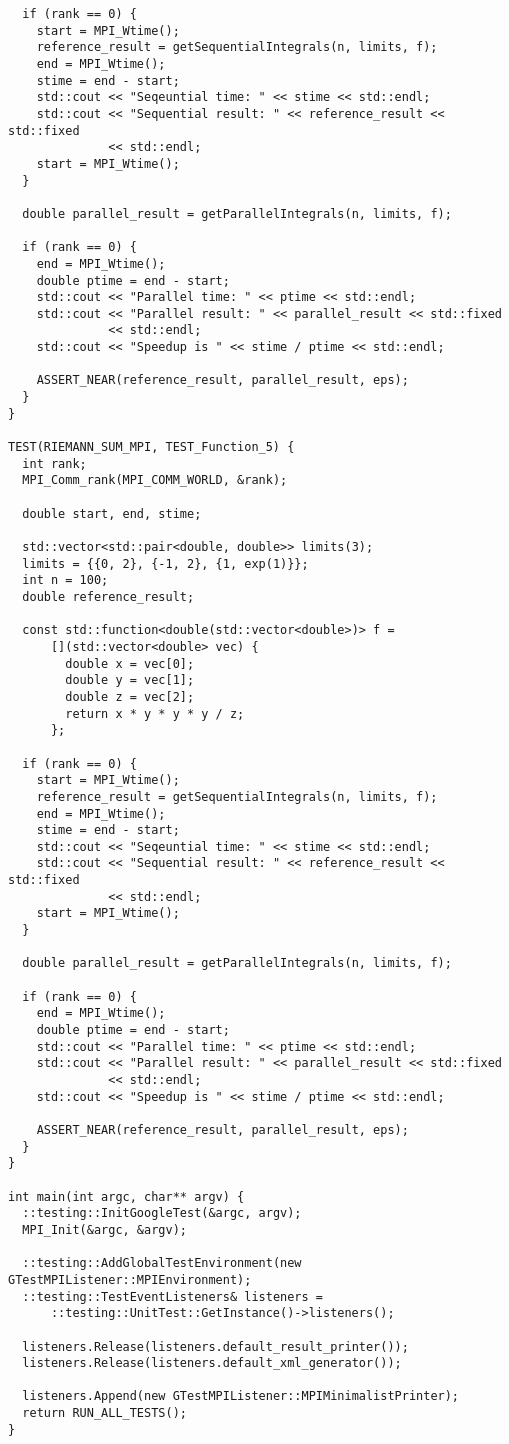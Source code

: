 \documentclass{report}
\begin{document}
\begin{lstlisting}
  if (rank == 0) {
    start = MPI_Wtime();
    reference_result = getSequentialIntegrals(n, limits, f);
    end = MPI_Wtime();
    stime = end - start;
    std::cout << "Seqeuntial time: " << stime << std::endl;
    std::cout << "Sequential result: " << reference_result << std::fixed
              << std::endl;
    start = MPI_Wtime();
  }

  double parallel_result = getParallelIntegrals(n, limits, f);

  if (rank == 0) {
    end = MPI_Wtime();
    double ptime = end - start;
    std::cout << "Parallel time: " << ptime << std::endl;
    std::cout << "Parallel result: " << parallel_result << std::fixed
              << std::endl;
    std::cout << "Speedup is " << stime / ptime << std::endl;

    ASSERT_NEAR(reference_result, parallel_result, eps);
  }
}

TEST(RIEMANN_SUM_MPI, TEST_Function_5) {
  int rank;
  MPI_Comm_rank(MPI_COMM_WORLD, &rank);

  double start, end, stime;

  std::vector<std::pair<double, double>> limits(3);
  limits = {{0, 2}, {-1, 2}, {1, exp(1)}};
  int n = 100;
  double reference_result;

  const std::function<double(std::vector<double>)> f =
      [](std::vector<double> vec) {
        double x = vec[0];
        double y = vec[1];
        double z = vec[2];
        return x * y * y * y / z;
      };

  if (rank == 0) {
    start = MPI_Wtime();
    reference_result = getSequentialIntegrals(n, limits, f);
    end = MPI_Wtime();
    stime = end - start;
    std::cout << "Seqeuntial time: " << stime << std::endl;
    std::cout << "Sequential result: " << reference_result << std::fixed
              << std::endl;
    start = MPI_Wtime();
  }

  double parallel_result = getParallelIntegrals(n, limits, f);

  if (rank == 0) {
    end = MPI_Wtime();
    double ptime = end - start;
    std::cout << "Parallel time: " << ptime << std::endl;
    std::cout << "Parallel result: " << parallel_result << std::fixed
              << std::endl;
    std::cout << "Speedup is " << stime / ptime << std::endl;

    ASSERT_NEAR(reference_result, parallel_result, eps);
  }
}

int main(int argc, char** argv) {
  ::testing::InitGoogleTest(&argc, argv);
  MPI_Init(&argc, &argv);

  ::testing::AddGlobalTestEnvironment(new GTestMPIListener::MPIEnvironment);
  ::testing::TestEventListeners& listeners =
      ::testing::UnitTest::GetInstance()->listeners();

  listeners.Release(listeners.default_result_printer());
  listeners.Release(listeners.default_xml_generator());

  listeners.Append(new GTestMPIListener::MPIMinimalistPrinter);
  return RUN_ALL_TESTS();
}

\end{lstlisting}
\end{document}
